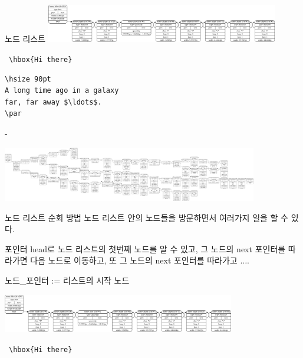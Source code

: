 \documentclass[t,10pt]{beamer}
\begin{document}
\begin{frame}[fragile]{노드 리스트}
  \href{run:images/hithere1.pdf}{\includegraphics[width=4in]{hithere1.pdf}}

  \vglue-18.5mm
  \hbox{\hskip15mm \verb|\hbox{Hi there}|}

  \vglue 19.5mm
  \begin{minipage}{.5\textwidth}
    \begin{Verbatim}[fontsize=\small]
\hsize 90pt
A long time ago in a galaxy
far, far away $\ldots$.
\par
    \end{Verbatim}
  \end{minipage}
  \begin{minipage}{.35\textwidth}
    \fboxsep-\fboxrule
  \end{minipage}

  \hskip-2mm
  \href{run:images/nodelist.pdf}{\includegraphics[width=4.4in]{nodelist.pdf}}
\end{frame}

\begin{frame}[fragile]{노드 리스트 순회 방법}
  노드 리스트 안의 노드들을 방문하면서 여러가지 일을 할 수 있다.

  포인터 \alert{head}로 노드 리스트의 첫번째 노드를
  알 수 있고, 그 노드의 \alert{next} 포인터를 따라가면
  다음 노드로 이동하고, 또 그 노드의 \alert{next} 포인터를 따라가고 $\ldots$.

  \begin{algorithm}[H]
    \SetAlgoNoLine
    \alert{
    노드\_포인터 := 리스트의 시작 노드\;
    }
  \end{algorithm}

  \href{run:images/hithere1.pdf}{\includegraphics[width=4in]{hithere1.pdf}}

  \vglue-18.5mm
  \hbox{\hskip15mm \verb|\hbox{Hi there}|}
\end{frame}
\end{document}
